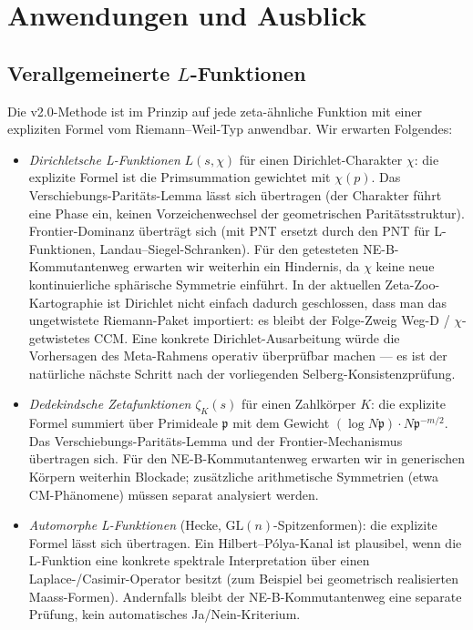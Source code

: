 \documentclass[12pt,a4paper]{article}
\theoremstyle{definition}
\theoremstyle{remark}
\begin{document}
\section{Anwendungen und Ausblick}
\label{sec:applications}

\subsection{\texorpdfstring{Verallgemeinerte $L$-Funktionen}{Verallgemeinerte L-Funktionen}}

Die v2.0-Methode ist im Prinzip auf jede zeta-ähnliche Funktion mit einer
expliziten Formel vom Riemann--Weil-Typ anwendbar. Wir erwarten Folgendes:

\begin{itemize}
\item \emph{Dirichletsche L-Funktionen} $L(s, \chi)$ für einen Dirichlet-Charakter
$\chi$: die explizite Formel ist die Primsummation gewichtet mit $\chi(p)$.
Das Verschiebungs-Paritäts-Lemma lässt sich übertragen (der Charakter führt eine Phase ein, keinen
Vorzeichenwechsel der geometrischen Paritätsstruktur). Frontier-Dominanz überträgt sich
(mit PNT ersetzt durch den PNT für L-Funktionen, Landau--Siegel-Schranken).
Für den getesteten NE-B-Kommutantenweg erwarten wir weiterhin ein Hindernis,
da $\chi$ keine neue kontinuierliche sphärische Symmetrie einführt. In der aktuellen Zeta-Zoo-Kartographie ist Dirichlet
nicht einfach dadurch geschlossen, dass man das ungetwistete Riemann-Paket importiert: es bleibt
der Folge-Zweig Weg-D / $\chi$-getwistetes CCM. Eine konkrete Dirichlet-Ausarbeitung
würde die Vorhersagen des Meta-Rahmens operativ
überprüfbar machen --- es ist der natürliche nächste Schritt nach der vorliegenden Selberg-Konsistenzprüfung.

\item \emph{Dedekindsche Zetafunktionen} $\zeta_K(s)$ für einen Zahlkörper $K$: die
explizite Formel summiert über Primideale $\mathfrak{p}$ mit dem Gewicht
$(\log N\mathfrak{p}) \cdot N\mathfrak{p}^{-m/2}$. Das Verschiebungs-Paritäts-Lemma und der
Frontier-Mechanismus übertragen sich. Für den NE-B-Kommutantenweg erwarten
wir in generischen Körpern weiterhin Blockade; zusätzliche arithmetische
Symmetrien (etwa CM-Phänomene) müssen separat analysiert werden.

\item \emph{Automorphe L-Funktionen} (Hecke, $\mathrm{GL}(n)$-Spitzenformen):
die explizite Formel lässt sich übertragen. Ein Hilbert--Pólya-Kanal ist
plausibel, wenn die L-Funktion eine konkrete spektrale Interpretation über
einen Laplace-/Casimir-Operator besitzt (zum Beispiel bei geometrisch
realisierten Maass-Formen). Andernfalls bleibt der NE-B-Kommutantenweg eine
separate Prüfung, kein automatisches Ja/Nein-Kriterium.
\end{itemize}
\end{document}
